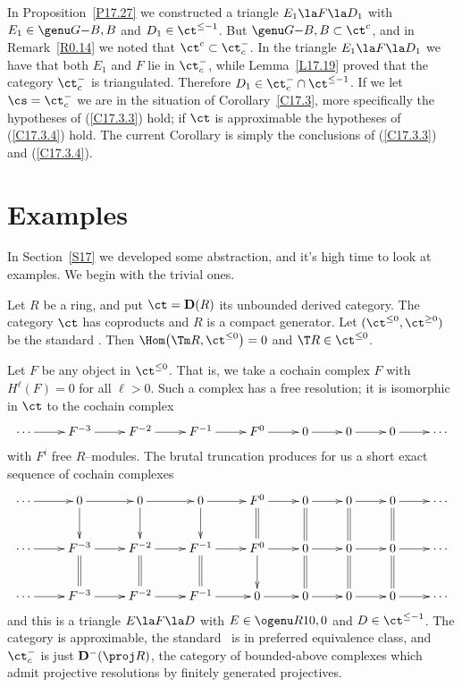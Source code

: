 \documentclass[11pt]{amsart}
\newcommand{\D}{{\mathbf D}}
\begin{document}
In Proposition~\ref{P17.27} we constructed a triangle $E_1\la F\la D_1$
with $E_1\in\genu G{}{-B,B}$ and $D_1\in\ct^{\leq-1}$.
But $\genu G{}{-B,B}\subset\ct^c$, and in
Remark~\ref{R0.14} we noted that $\ct^c\subset\ct^-_c$.
In the triangle $E_1\la F\la D_1$ we have that both $E_1$ and $F$
lie in $\ct^-_c$, while Lemma~\ref{L17.19} proved that the
category $\ct^-_c$ is triangulated. Therefore $D_1\in\ct^-_c\cap\ct^{\leq-1}$.
If we let $\cs=\ct^-_c$ we are
in the situation of Corollary~\ref{C17.3}, more
specifically the hypotheses of (\ref{C17.3.3}) hold; if $\ct$
is approximable the hypotheses of (\ref{C17.3.4}) hold.
The current
Corollary
is simply the conclusions
of (\ref{C17.3.3}) and (\ref{C17.3.4}).
\eprf

\section{Examples}
\label{S19}

In Section~\ref{S17} we developed some abstraction, and it's high time
to look at examples. We begin with the trivial ones.

Let $R$ be a ring, and put $\ct=\D(R)$ its unbounded derived category. The
category $\ct$ has coproducts and $R$ is a compact generator.
Let $(\ct^{\leq0},\ct^{\geq0})$ be the standard \tstr. Then
$\Hom\big(\Tm R,\ct^{\leq0}\big)=0$ and $\T R\in\ct^{\leq0}$.

Let $F$ be any object in $\ct^{\leq0}$. That is, we take
a cochain complex $F$ with $H^\ell(F)=0$ for all $\ell>0$.
Such a complex has a free resolution; it is
isomorphic in $\ct$ to the cochain complex
\[\xymatrix{
  \cdots\ar[r] & F^{-3}\ar[r] & F^{-2}\ar[r] & F^{-1}\ar[r] & F^{0}\ar[r] &
   0\ar[r] & 0\ar[r] &0\ar[r] &\cdots
}\]
with $F^i$ free $R$--modules. The brutal truncation produces for us
a short exact sequence of cochain complexes
\[\xymatrix{
  \cdots\ar[r] & 0\ar[r]\ar[d] & 0\ar[d]\ar[r]
  & 0\ar[d]\ar[r] & F^{0}\ar@{=}[d]\ar[r] &
   0\ar@{=}[d]\ar[r] & 0\ar@{=}[d]\ar[r] &0\ar[r]\ar@{=}[d] &\cdots \\
  \cdots\ar[r] & F^{-3}\ar[r]\ar@{=}[d] & F^{-2}\ar@{=}[d]\ar[r]
  & F^{-1}\ar@{=}[d]\ar[r] & F^{0}\ar[d]\ar[r] &
   0\ar@{=}[d]\ar[r] & 0\ar@{=}[d]\ar[r] &0\ar[r]\ar@{=}[d] &\cdots \\
  \cdots\ar[r] & F^{-3}\ar[r] & F^{-2}\ar[r] & F^{-1}\ar[r] & 0\ar[r] &
   0\ar[r] & 0\ar[r] &0\ar[r] &\cdots
}\]
and this is a triangle $E\la F\la D$ with $E\in\ogenu R1{0,0}$ and
$D\in\ct^{\leq-1}$. The category is approximable, the standard \tstr\
is in preferred equivalence class, and $\ct^-_c$ is
just $\D^-(\proj R)$,
the category of bounded-above complexes which
admit projective resolutions by finitely generated projectives.
\end{document}
